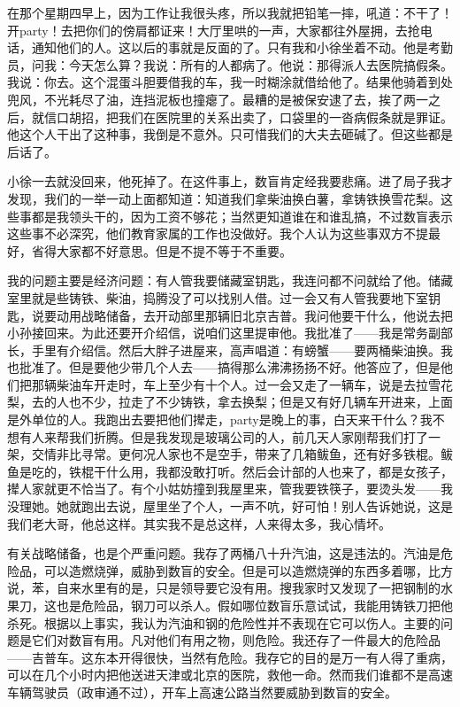在那个星期四早上，因为工作让我很头疼，所以我就把铅笔一摔，吼道：不干了！开party！去把你们的傍肩都证来！大厅里哄的一声，大家都往外屋拥，去抢电话，通知他们的人。这以后的事就是反面的了。只有我和小徐坐着不动。他是考勤员，问我：今天怎么算？我说：所有的人都病了。他说：那得派人去医院搞假条。我说：你去。这个混蛋斗胆要借我的车，我一时糊涂就借给他了。结果他骑着到处兜风，不光耗尽了油，连挡泥板也撞瘪了。最糟的是被保安逮了去，挨了两一之后，就信口胡招，把我们在医院里的关系出卖了，口袋里的一沓病假条就是罪证。他这个人干出了这种事，我倒是不意外。只可惜我们的大夫去砸碱了。但这些都是后话了。 

小徐一去就没回来，他死掉了。在这件事上，数盲肯定经我要悲痛。进了局子我才发现，我们的一举一动上面都知道：知道我们拿柴油换白薯，拿铸铁换雪花梨。这些事都是我领头干的，因为工资不够花；当然更知道谁在和谁乱搞，不过数盲表示这些事不必深究，他们教育家属的工作也没做好。我个人认为这些事双方不提最好，省得大家都不好意思。但是不提不等于不重要。 

我的问题主要是经济问题：有人管我要储藏室钥匙，我连问都不问就给了他。储藏室里就是些铸铁、柴油，捣腾没了可以找别人借。过一会又有人管我要地下室钥匙，说要动用战略储备，去开动部里那辆旧北京吉普。我问他要干什么，他说去把小孙接回来。为此还要开介绍信，说咱们这里提审他。我批准了——我是常务副部长，手里有介绍信。然后大胖子进屋来，高声唱道：有螃蟹——要两桶柴油换。我也批准了。但是要他少带几个人去——搞得那么沸沸扬扬不好。他答应了，但是他们把那辆柴油车开走时，车上至少有十个人。过一会又走了一辆车，说是去拉雪花梨，去的人也不少，拉走了不少铸铁，拿去换梨；但是又有好几辆车开进来，上面是外单位的人。我跑出去要把他们撵走，party是晚上的事，白天来干什么？我不想有人来帮我们折腾。但是我发现是玻璃公司的人，前几天人家刚帮我们打了一架，交情非比寻常。更何况人家也不是空手，带来了几箱鲅鱼，还有好多铁棍。鲅鱼是吃的，铁棍干什么用，我都没敢打听。然后会计部的人也来了，都是女孩子，撵人家就更不恰当了。有个小姑妨撞到我屋里来，管我要铁筷子，要烫头发——我没理她。她就跑出去说，屋里坐了个人，一声不吭，好可怕！别人告诉她说，这是我们老大哥，他总这样。其实我不是总这样，人来得太多，我心情坏。 

有关战略储备，也是个严重问题。我存了两桶八十升汽油，这是违法的。汽油是危险品，可以造燃烧弹，威胁到数盲的安全。但是可以造燃烧弹的东西多着哪，比方说，苯，自来水里有的是，只是领导要它没有用。搜我家时又发现了一把钢制的水果刀，这也是危险品，钢刀可以杀人。假如哪位数盲乐意试试，我能用铸铁刀把他杀死。根据以上事实，我认为汽油和钢的危险性并不表现在它可以伤人。主要的问题是它们对数盲有用。凡对他们有用之物，则危险。我还存了一件最大的危险品 ——吉普车。这东本开得很快，当然有危险。我存它的目的是万一有人得了重病，可以在几个小时内把他送进天津或北京的医院，救他一命。然而我们谁都不是高速车辆驾驶员（政审通不过），开车上高速公路当然要威胁到数盲的安全。 



